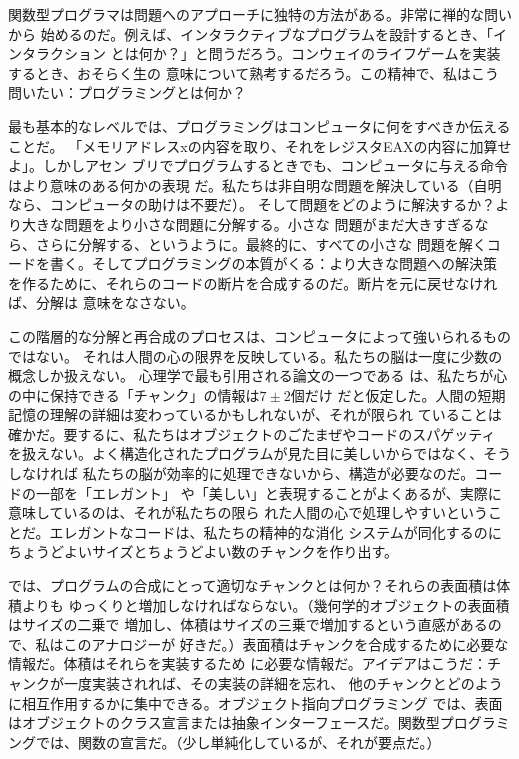 関数型プログラマは問題へのアプローチに独特の方法がある。非常に禅的な問いから
始めるのだ。例えば、インタラクティブなプログラムを設計するとき、「インタラクション
とは何か？」と問うだろう。コンウェイのライフゲームを実装するとき、おそらく生の
意味について熟考するだろう。この精神で、私はこう問いたい：プログラミングとは何か？

最も基本的なレベルでは、プログラミングはコンピュータに何をすべきか伝えることだ。
「メモリアドレスxの内容を取り、それをレジスタEAXの内容に加算せよ」。しかしアセン
ブリでプログラムするときでも、コンピュータに与える命令はより意味のある何かの表現
だ。私たちは非自明な問題を解決している（自明なら、コンピュータの助けは不要だ）。
そして問題をどのように解決するか？より大きな問題をより小さな問題に分解する。小さな
問題がまだ大きすぎるなら、さらに分解する、というように。最終的に、すべての小さな
問題を解くコードを書く。そしてプログラミングの本質がくる：より大きな問題への解決策
を作るために、それらのコードの断片を合成するのだ。断片を元に戻せなければ、分解は
意味をなさない。

この階層的な分解と再合成のプロセスは、コンピュータによって強いられるものではない。
それは人間の心の限界を反映している。私たちの脳は一度に少数の概念しか扱えない。
心理学で最も引用される論文の一つである
は、私たちが心の中に保持できる「チャンク」の情報は$7 \pm 2$個だけ
だと仮定した。人間の短期記憶の理解の詳細は変わっているかもしれないが、それが限られ
ていることは確かだ。要するに、私たちはオブジェクトのごたまぜやコードのスパゲッティ
を扱えない。よく構造化されたプログラムが見た目に美しいからではなく、そうしなければ
私たちの脳が効率的に処理できないから、構造が必要なのだ。コードの一部を「エレガント」
や「美しい」と表現することがよくあるが、実際に意味しているのは、それが私たちの限ら
れた人間の心で処理しやすいということだ。エレガントなコードは、私たちの精神的な消化
システムが同化するのにちょうどよいサイズとちょうどよい数のチャンクを作り出す。

では、プログラムの合成にとって適切なチャンクとは何か？それらの表面積は体積よりも
ゆっくりと増加しなければならない。（幾何学的オブジェクトの表面積はサイズの二乗で
増加し、体積はサイズの三乗で増加するという直感があるので、私はこのアナロジーが
好きだ。）表面積はチャンクを合成するために必要な情報だ。体積はそれらを実装するため
に必要な情報だ。アイデアはこうだ：チャンクが一度実装されれば、その実装の詳細を忘れ、
他のチャンクとどのように相互作用するかに集中できる。オブジェクト指向プログラミング
では、表面はオブジェクトのクラス宣言または抽象インターフェースだ。関数型プログラミ
ングでは、関数の宣言だ。（少し単純化しているが、それが要点だ。）

